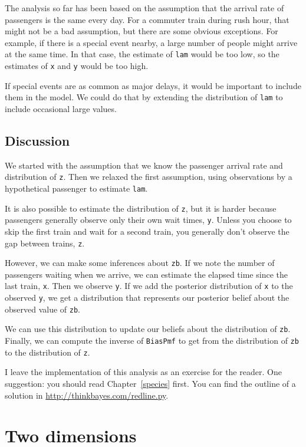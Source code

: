 \documentclass[12pt]{book}
\begin{document}
The analysis so far has been based on the assumption that the
arrival rate of passengers is the same every day.  For a commuter
train during rush hour, that might not be a bad assumption, but
there are some obvious exceptions.  For example, if there is a special
event nearby, a large number of people might arrive at the same time.
In that case, the estimate of {\tt lam} would be too low, so the
estimates of {\tt x} and {\tt y} would be too high.

If special events are as common as major delays, it would
be important to include them in the model.  We could do that by
extending the distribution of {\tt lam} to include occasional
large values.


\section{Discussion}

We started with the assumption that we know the passenger arrival
rate and distribution of {\tt z}.  Then we relaxed the first assumption,
using observations by a hypothetical passenger to estimate
{\tt lam}.

It is also possible to estimate the
distribution of {\tt z}, but it is harder because passengers generally
observe only their own wait times, {\tt y}.  Unless you choose to skip
the first train and wait for a second train, you generally don't
observe the gap between trains, {\tt z}.

However, we can make some inferences about {\tt zb}.  If we note
the number of passengers waiting when we arrive, we can estimate
the elapsed time since the last train, {\tt x}.  Then we observe
{\tt y}.  If we add the posterior distribution of {\tt x} to
the observed {\tt y}, we get a distribution that represents
our posterior belief about the observed value of {\tt zb}.

We can use this distribution to update our beliefs about the
distribution of {\tt zb}.  Finally, we can compute the
inverse of {\tt BiasPmf} to get from the distribution of {\tt zb}
to the distribution of {\tt z}.

I leave the implementation of this analysis as an exercise for the
reader.  One suggestion: you should read Chapter~\ref{species} first.
You can find the outline of
a solution in \url{http://thinkbayes.com/redline.py}.


\chapter{Two dimensions}
\label{paintball}
\end{document}
